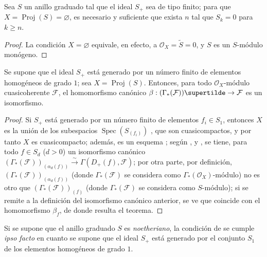 \documentclass[oneside,10pt]{amsart}
\makeatletter
\renewcommand{\geq}{\geqslant}
\newcommand{\ega@arrow}[2]{\mathchoice{#1}{#2}{#2}{#2}}
\renewcommand{\to}{\ega@arrow{\longrightarrow}{\rightarrow}}
\let\EGAOriginalLabel\label
\renewcommand{\label}[1]{\phantomsection\EGAOriginalLabel{#1}}
\makeatother
\begin{document}
\begin{corollary}[2.7.4]
\label{II.2.7.4-fr}
Sea $S$ un anillo graduado tal que el ideal $S_+$ sea de tipo finito; para que $X=\operatorname{Proj}(S)=\varnothing$, es necesario y suficiente que exista $n$ tal que $S_k=0$ para $k\geq n$.
\end{corollary}

\begin{proof}
La condición $X=\varnothing$ equivale, en efecto, a $\mathcal{O}_X=\widetilde{S}=0$, y $S$ es un $S$-módulo monógeno.
\end{proof}

\begin{theorem}[2.7.5]
\label{II.2.7.5-fr}
Se supone que el ideal $S_+$ está generado por un número finito de elementos homogéneos de grado $1$; sea $X=\operatorname{Proj}(S)$.
Entonces, para todo $\mathcal{O}_X$-módulo cuasicoherente $\mathcal{F}$, el homomorfismo canónico $\beta:(\Gamma_*(\mathcal{F}))\supertilde
\to\mathcal{F}$  es un isomorfismo.
\end{theorem}

\begin{proof}
Si $S_+$ está generado por un número finito de elementos $f_i\in S_1$, entonces $X$ es la unión de los subespacios $\operatorname{Spec}(S_{(f_i)})$ , que son cuasicompactos, y por tanto $X$ es cuasicompacto; además, es un esquema ; según ,  y , se tiene, para todo $f\in S_d$ ($d>0$) un isomorfismo canónico $(\Gamma_*(\mathcal{F}))_{(\alpha_d(f))}\xrightarrow{\sim}
\Gamma(D_+(f),\mathcal{F})$; por otra parte, por definición, $(\Gamma_*(\mathcal{F}))_{(\alpha_d(f))}$ (donde $\Gamma_*(\mathcal{F})$ se considera como $\Gamma_*(\mathcal{O}_X)$-módulo) no es otro que $(\Gamma_*(\mathcal{F}))_{(f)}$ (donde $\Gamma_*(\mathcal{F})$ se considera como $S$-módulo); si se remite a la definición  del isomorfismo canónico anterior, se ve que coincide con el homomorfismo $\beta_f$, de donde resulta el teorema.
\end{proof}

\begin{remark}[2.7.6]
\label{II.2.7.6-fr}
Si se supone que el anillo graduado $S$ es \emph{noetheriano}, la condición de  se cumple \emph{ipso facto} en cuanto se supone que el ideal $S_+$ está generado por el conjunto $S_1$ de los elementos homogéneos de grado $1$.
\end{remark}
\end{document}

